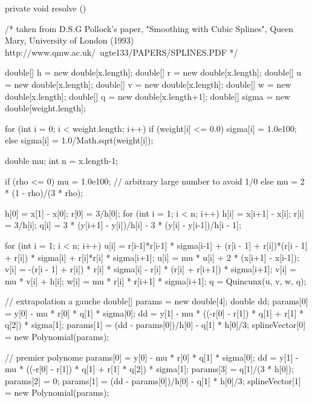 \begin{htmlonly}
\end{htmlonly}
\begin{code}\begin{hide}

   private void resolve () {
   /*
      taken from D.S.G Pollock's paper, "Smoothing with Cubic Splines",
      Queen Mary, University of London (1993)
      http://www.qmw.ac.uk/~ugte133/PAPERS/SPLINES.PDF
   */

      double[] h = new double[x.length];
      double[] r = new double[x.length];
      double[] u = new double[x.length];
      double[] v = new double[x.length];
      double[] w = new double[x.length];
      double[] q = new double[x.length+1];
      double[] sigma = new double[weight.length];

      for (int i = 0; i < weight.length; i++) {
         if (weight[i] <= 0.0)
            sigma[i] = 1.0e100;
         else
            sigma[i] = 1.0/Math.sqrt(weight[i]);
      }

      double mu;
      int n = x.length-1;

      if (rho <= 0)
         mu = 1.0e100;   // arbitrary large number to avoid 1/0
      else
         mu = 2 * (1 - rho)/(3 * rho);

      h[0] = x[1] - x[0];
      r[0] = 3/h[0];
      for (int i = 1; i < n; i++) {
         h[i] = x[i+1] - x[i];
         r[i] = 3/h[i];
         q[i] = 3 * (y[i+1] - y[i])/h[i] - 3 * (y[i] - y[i-1])/h[i - 1];
      }

      for (int i = 1; i < n; i++) {
         u[i] = r[i-1]*r[i-1] * sigma[i-1]
               + (r[i - 1] + r[i])*(r[i - 1] + r[i]) * sigma[i] +
                 r[i]*r[i] * sigma[i+1];
         u[i] = mu * u[i] + 2 * (x[i+1] - x[i-1]);
         v[i] = -(r[i - 1] + r[i]) * r[i] * sigma[i] - r[i] * (r[i] +
                 r[i+1]) * sigma[i+1];
         v[i] = mu * v[i] + h[i];
         w[i] = mu * r[i] * r[i+1] * sigma[i+1];
      }
      q = Quincunx(u, v, w, q);

      // extrapolation a gauche
      double[] params = new double[4];
      double dd;
      params[0] = y[0] - mu * r[0] * q[1] * sigma[0];
      dd = y[1] - mu * ((-r[0] - r[1]) * q[1] + r[1] * q[2]) * sigma[1];
      params[1] = (dd - params[0])/h[0] - q[1] * h[0]/3;
      splineVector[0] = new Polynomial(params);

      // premier polynome
      params[0] = y[0] - mu * r[0] * q[1] * sigma[0];
      dd = y[1] - mu * ((-r[0] - r[1]) * q[1] + r[1] * q[2]) * sigma[1];
      params[3] = q[1]/(3 * h[0]);
      params[2] = 0;
      params[1] = (dd - params[0])/h[0] - q[1] * h[0]/3;
      splineVector[1] = new Polynomial(params);

}
\end{hide}
\end{code}
